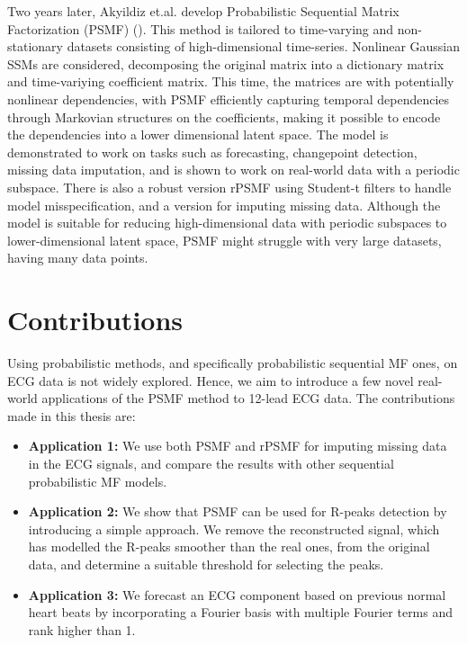 \documentclass{mldsmsc}
\begin{document}
\noindent Two years later, Akyildiz et.al. develop Probabilistic Sequential Matrix Factorization (PSMF) (\cite{akyildiz2021probabilistic}). This method is tailored to time-varying and non-stationary datasets consisting of high-dimensional time-series. Nonlinear Gaussian SSMs are considered, decomposing the original matrix into a dictionary matrix and time-variying coefficient matrix. This time, the matrices are with potentially nonlinear dependencies, with PSMF efficiently capturing temporal dependencies through Markovian structures on the coefficients, making it possible to encode the dependencies into a lower dimensional latent space. The model is demonstrated to work on tasks such as forecasting, changepoint detection, missing data imputation, and is shown to work on real-world data with a periodic subspace. There is also a robust version rPSMF using Student-t filters to handle model misspecification, and a version for imputing missing data. Although the model is suitable for reducing high-dimensional data with periodic subspaces to lower-dimensional latent space, PSMF might struggle with very large datasets, having many data points. \newline

\section{Contributions}

Using probabilistic methods, and specifically probabilistic sequential MF ones, on ECG data is not widely explored. Hence, we aim to introduce a few novel real-world applications of the PSMF method to 12-lead ECG data. The contributions made in this thesis are:

\begin{itemize}
    \item \textbf{Application 1:} We use both PSMF and rPSMF for imputing missing data in the ECG signals, and compare the results with other sequential probabilistic MF models.
    \item \textbf{Application 2:} We show that PSMF can be used for R-peaks detection by introducing a simple approach. We remove the reconstructed signal, which has modelled the R-peaks smoother than the real ones, from the original data, and determine a suitable threshold for selecting the peaks. 
    \item \textbf{Application 3:} We forecast an ECG component based on previous normal heart beats by incorporating a Fourier basis with multiple Fourier terms and rank higher than 1. 
\end{itemize}
\end{document}
